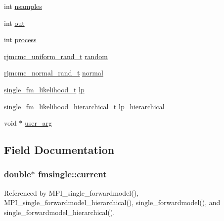 \begin{DoxyCompactItemize}
\item 
int \hyperlink{structfmsingle_a24fbe662b9150ff39a04ca7be2e1350a}{nsamples}
\item 
int \hyperlink{structfmsingle_ab1234622eb6c5c5ba6d9b4ea55e8b90c}{out}
\item 
int \hyperlink{structfmsingle_ad3fa1724fad1be77f25e08e3e740263b}{process}
\item 
\hyperlink{rjmcmc__random_8h_accc36e83459ada552d8f70962190dac0}{rjmcmc\+\_\+uniform\+\_\+rand\+\_\+t} \hyperlink{structfmsingle_aabc852b5e142570044ef6ac8803158ef}{random}
\item 
\hyperlink{rjmcmc__random_8h_a498625755d377b68ad37c9ab360e83b0}{rjmcmc\+\_\+normal\+\_\+rand\+\_\+t} \hyperlink{structfmsingle_a70e043c1b30c30777ff0725ee90151a3}{normal}
\item 
\hyperlink{forwardmodel_8h_a094bcc9790c7865c0a721078d5334420}{single\+\_\+fm\+\_\+likelihood\+\_\+t} \hyperlink{structfmsingle_a8461a52c9112de045c4276da3eca60ec}{lp}
\item 
\hyperlink{forwardmodel_8h_a20a68d1e54609fed41954a0469e16d2c}{single\+\_\+fm\+\_\+likelihood\+\_\+hierarchical\+\_\+t} \hyperlink{structfmsingle_ae4b5351778dc439e3e8a23e5ab63f26f}{lp\+\_\+hierarchical}
\item 
void $\ast$ \hyperlink{structfmsingle_afdda5c6d655200456d36d1db08bfc98e}{user\+\_\+arg}
\end{DoxyCompactItemize}


\subsection{Field Documentation}
\subsubsection[{\texorpdfstring{current}{current}}]{\setlength{\rightskip}{0pt plus 5cm}double$\ast$ fmsingle\+::current}\hypertarget{structfmsingle_a3d260e319a4ddae6e4647835c0bd4071}{}\label{structfmsingle_a3d260e319a4ddae6e4647835c0bd4071}


Referenced by M\+P\+I\+\_\+single\+\_\+forwardmodel(), M\+P\+I\+\_\+single\+\_\+forwardmodel\+\_\+hierarchical(), single\+\_\+forwardmodel(), and single\+\_\+forwardmodel\+\_\+hierarchical().

